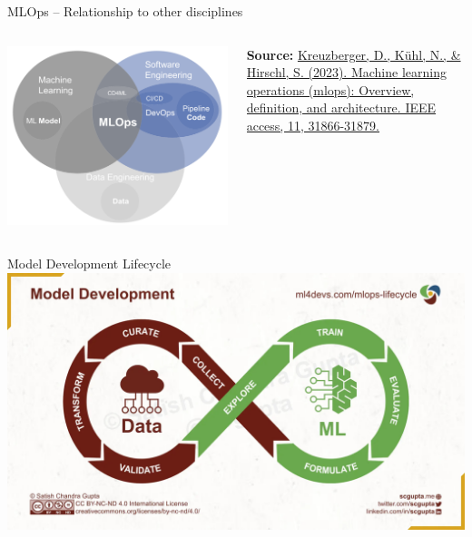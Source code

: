 \documentclass[ignorenonframetext,xcolor=x11names]{beamer}
\begin{document}
\begin{frame}{MLOps -- Relationship to other disciplines}
\begin{columns}
\begin{column}{.9\textwidth}
\centering
\includegraphics[width=\textwidth]{Kreuzbergeretal_fig5.png}
\end{column}
\begin{column}{.15\textwidth}
\tiny \textbf{Source:} \href{https://ieeexplore.ieee.org/abstract/document/10081336}{Kreuzberger, D., K\"uhl, N., \& Hirschl, S. (2023). Machine learning operations (mlops): Overview, definition, and architecture. IEEE access, 11, 31866-31879.}
\end{column}
\end{columns}
\end{frame}


\begin{frame}{Model Development Lifecycle}
\includegraphics[width=\textwidth]{mlmodel.jpeg}
\end{frame}
\end{document}
